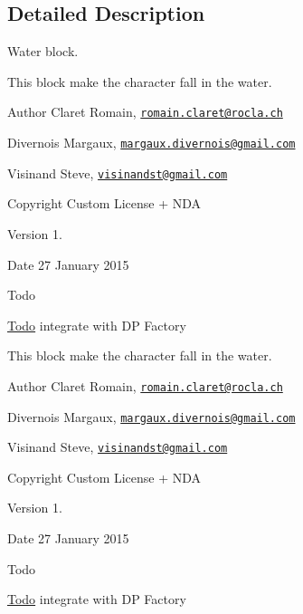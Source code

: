 \subsection{Detailed Description}
Water block. 

This block make the character fall in the water. \begin{DoxyAuthor}{Author}
Claret Romain, \href{mailto:romain.claret@rocla.ch}{\tt romain.\+claret@rocla.\+ch} 

Divernois Margaux, \href{mailto:margaux.divernois@gmail.com}{\tt margaux.\+divernois@gmail.\+com} 

Visinand Steve, \href{mailto:visinandst@gmail.com}{\tt visinandst@gmail.\+com} 
\end{DoxyAuthor}
\begin{DoxyCopyright}{Copyright}
Custom License + N\+D\+A 
\end{DoxyCopyright}
\begin{DoxyVersion}{Version}
1. 
\end{DoxyVersion}
\begin{DoxyDate}{Date}
27 January 2015 
\end{DoxyDate}
\begin{DoxyRefDesc}{Todo}
\item[\hyperlink{todo__todo000003}{Todo}]integrate with D\+P Factory \end{DoxyRefDesc}


This block make the character fall in the water. \begin{DoxyAuthor}{Author}
Claret Romain, \href{mailto:romain.claret@rocla.ch}{\tt romain.\+claret@rocla.\+ch} 

Divernois Margaux, \href{mailto:margaux.divernois@gmail.com}{\tt margaux.\+divernois@gmail.\+com} 

Visinand Steve, \href{mailto:visinandst@gmail.com}{\tt visinandst@gmail.\+com} 
\end{DoxyAuthor}
\begin{DoxyCopyright}{Copyright}
Custom License + N\+D\+A 
\end{DoxyCopyright}
\begin{DoxyVersion}{Version}
1. 
\end{DoxyVersion}
\begin{DoxyDate}{Date}
27 January 2015 
\end{DoxyDate}
\begin{DoxyRefDesc}{Todo}
\item[\hyperlink{todo__todo000012}{Todo}]integrate with D\+P Factory \end{DoxyRefDesc}


